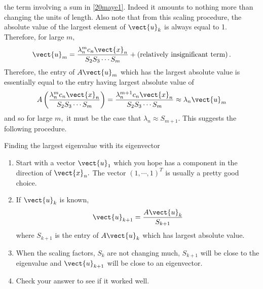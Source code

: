 the term involving a sum in \ref{20maye1}. Indeed it amounts to nothing more
than changing the units of length. Also note that from this scaling
procedure, the absolute value of the largest element of $\vect{u}_{k}$ is
always equal to 1. Therefore, for large $m,$
\begin{equation*}
\vect{u}_{m}=\vspace{0.05in}\frac{\lambda _{n}^{m}c_{n}\vect{x}_{n}}{S_{2}S_{3}\cdots S_{m}}+\left( \text{relatively insignificant term}\right) .
\end{equation*}
Therefore, the entry of $A\vect{u}_{m}$ which has the largest absolute value
is essentially equal to the entry having largest absolute value of 
\begin{equation*}
A\left( \vspace{0.05in}\frac{\lambda _{n}^{m}c_{n}\vect{x}_{n}}{S_{2}S_{3}\cdots S_{m}}\right) =\vspace{0.05in}\frac{\lambda _{n}^{m+1}c_{n}
\vect{x}_{n}}{S_{2}S_{3}\cdots S_{m}}\approx \lambda _{n}\vect{u}_{m}
\end{equation*}%
and so for large $m,$ it must be the case that $\lambda _{n}\approx S_{m+1}.$
This suggests the following procedure.

\begin{procedure}{Finding the largest eigenvalue with its eigenvector}{}
\begin{enumerate}
\item Start with a vector $\vect{u}_{1}$ which you hope has a component in
the direction of $\vect{x}_{n}.$ The vector $\left( 1,\cdots ,1\right) ^{T}$
is usually a pretty good choice.

\item If $\vect{u}_{k}$ is known, 
\begin{equation*}
\vect{u}_{k+1}=\frac{A\vect{u}_{k}}{S_{k+1}}
\end{equation*}
where $S_{k+1}$ is the entry of $A\vect{u}_{k}$ which has largest absolute
value.

\item When the scaling factors, $S_{k}$ are not changing much, $S_{k+1}$
will be close to the eigenvalue and $\vect{u}_{k+1}$ will be close to an
eigenvector.

\item Check your answer to see if it worked well.
\end{enumerate}
\end{procedure}


